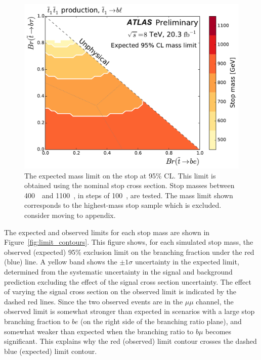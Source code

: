 \begin{figure}[p]
  \centering
  \includegraphics[width=\textwidth]
    {figs/blstop/mass_limit_contours_no_extras_exp.pdf}
  \caption{The expected mass limit on the stop at 95\% CL.
    This limit is obtained using the nominal stop cross section.
    Stop masses between 400~\GeV\ and 1100~\GeV, in steps of 100~\GeV, are
    tested.
    The mass limit shown corresponds to the highest-mass stop sample which is
    excluded.
    {\color{red} consider moving to appendix.}
  }
  \label{fig:mass_limit_exp}
\end{figure}

The expected and observed limits for each stop mass are shown in
Figure~\ref{fig:limit_contours}.
This figure shows, for each simulated stop mass, the observed (expected)
95\% exclusion limit on the branching fraction under the red (blue) line.
A yellow band shows the $\pm 1\sigma$ uncertainty in the expected limit,
determined from the systematic uncertainty in the signal and background
prediction excluding the effect of the signal cross section uncertainty.
The effect of varying the signal cross section on the observed limit is
indicated by the dashed red lines.
Since the two observed events are in the $\mu\mu$ channel, the observed limit
is somewhat stronger than expected in scenarios with a large stop branching
fraction to $be$ (on the right side of the branching ratio plane), and somewhat
weaker than expected when the branching ratio to $b\mu$ becomes significant.
This explains why the red (observed) limit contour crosses the dashed
blue (expected) limit contour.


